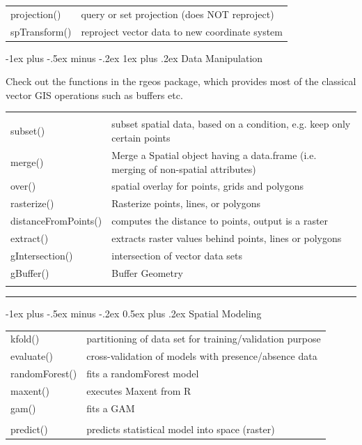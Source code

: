\documentclass[10pt,landscape]{article}
\makeatletter
\renewcommand{\section}{\@startsection{section}{1}{0mm}%
                                {-1ex plus -.5ex minus -.2ex}%
                                {0.5ex plus .2ex}%
                                {\normalfont\large\bfseries}}
\renewcommand{\subsubsection}{\@startsection{subsubsection}{3}{0mm}%
                                {-1ex plus -.5ex minus -.2ex}%
                                {1ex plus .2ex}%
                                {\normalfont\small\bfseries}}
\makeatother
\begin{document}
\begin{multicols}{3}
\begin{tabular}{@{}p{\the\MyLen}%
                @{}p{\linewidth-\the\MyLen}@{}}
                
projection()	  & query or set projection (does NOT reproject)\\                               
spTransform()	  & reproject vector data to new coordinate system \\
               

\end{tabular}


\subsubsection{Data Manipulation}

Check out the functions in the rgeos package, which provides most of the classical vector GIS operations such as buffers etc.\\


\begin{tabular}{@{}p{\the\MyLen}%
                @{}p{\linewidth-\the\MyLen}@{}}
                & \\
subset()		& subset spatial data, based on a condition, e.g. keep only certain points \\                
merge() 		& Merge a Spatial object having a data.frame (i.e. merging of non-spatial attributes)\\
over()			& spatial overlay for points, grids and polygons \\
rasterize() 		& Rasterize points, lines, or polygons\\ 
distanceFromPoints()    & computes the distance to points, output is a raster\\
extract()		& extracts raster values behind points, lines or polygons \\
gIntersection()		& intersection of vector data sets \\
gBuffer()		& Buffer Geometry \\
 & 
\end{tabular}


\rule{0.32\textwidth}{0.4pt}



\section{Spatial Modeling}

\begin{tabular}{@{}p{\the\MyLen}%
                @{}p{\linewidth-\the\MyLen}@{}}
kfold() & partitioning of data set for training/validation purpose\\
evaluate() & cross-validation of models with presence/absence data\\               
randomForest() & fits a randomForest model  \\
maxent() & executes Maxent from R\\
gam() & fits a GAM \\
 &  \\                
predict() & predicts statistical model into space (raster) \\


\end{tabular}
\end{multicols}
\end{document}

